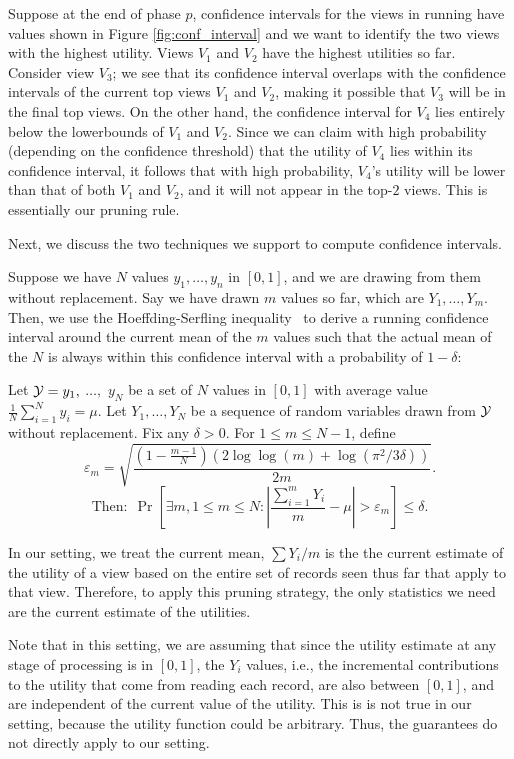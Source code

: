 Suppose at the end of phase $p$, confidence intervals for the views in
running have values shown in Figure \ref{fig:conf_interval} and we want to
identify the two views with the highest utility.
Views $V_1$ and $V_2$ have the highest utilities so far.
Consider view $V_3$; we see that its confidence interval overlaps with the
confidence intervals of the current top views $V_1$ and $V_2$, making it possible
that $V_3$ will be in the final top views. On the other hand, the confidence
interval for $V_4$ lies entirely below the lowerbounds of $V_1$ and $V_2$.
Since we can claim with high probability (depending on the confidence threshold)
that the utility of $V_4$ lies within its confidence interval, it follows that
with high probability, $V_4$'s utility will be lower than that of both $V_1$ and
$V_2$, and it will not appear in the top-$2$ views.
This is essentially our pruning rule. 

Next, we discuss the two techniques we support to compute confidence intervals.


Suppose we have $N$ values $y_1, \ldots, y_n$ in $[0, 1]$, and we are drawing
from them without replacement. 
Say we have drawn $m$ values so far, which are $Y_1, \ldots, Y_m$.
Then, we use the Hoeffding-Serfling inequality~\cite{serfling1974probability} 
to derive a running 
confidence interval around the current mean 
of the $m$ values such that the actual mean of the $N$
is always within this confidence interval with a probability of $1 - \delta$:
\begin{theorem}
\label{thm:hs}
Let $\mathcal{Y} = y_1,$ $\ldots,$ $y_N$ be a set of $N$ 
values in $[0,1]$ with average value
$\frac1N \sum_{i=1}^N y_i = \mu$.
Let $Y_1,\ldots,Y_N$ be a 
sequence of random variables drawn from $\mathcal{Y}$ without
replacement.
Fix any $\delta > 0$. For $1 \le m \le N-1$, define
$$
\varepsilon_m = \sqrt{\frac{(1-\frac{m-1}N)(2\log \log (m) + \log(\pi^2/3\delta))}{2m}}.
$$
$$
\textrm{Then:} \ \   \Pr\left[ \exists m, 1 \le m \le N : 
  \left|\frac{\sum_{i=1}^m Y_i}{m} - \mu\right| > \varepsilon_m \right] 
\le \delta.
$$
\end{theorem}
In our setting, we treat the current mean, $\sum Y_i / m$ is the 
the current estimate of the utility of a view 
based on the entire set of records seen thus far that apply to that view. 
Therefore, to apply this pruning strategy, the only statistics
we need are the current estimate of the utilities.

Note that in this setting, we are assuming that since the
utility estimate at any stage of processing is in $[0, 1]$, 
the $Y_i$ values, i.e., the incremental contributions to the utility
that come from reading each record, are also between $[0, 1]$,
and are independent of the current value of the utility. 
This is is not true in our setting, 
because the utility function could be arbitrary.
Thus, the guarantees do not directly apply to our setting. 

